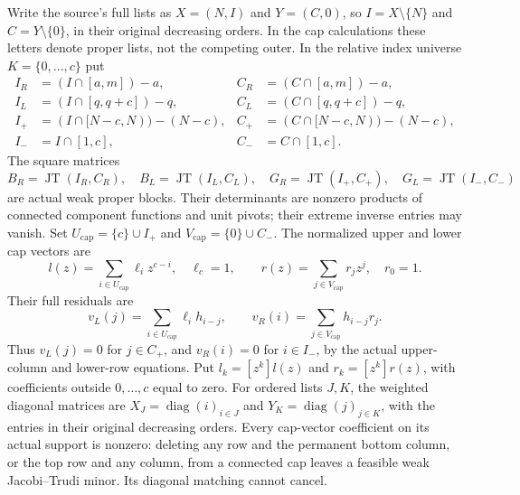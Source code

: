 \documentclass[11pt,a4paper]{amsart}
\numberwithin{equation}{section}
\theoremstyle{plain}
\theoremstyle{definition}
\newcommand{\JT}{\operatorname{JT}}
\DeclareMathOperator{\diag}{diag}
\begin{document}
Write the source's full lists as \(X=(N,I)\) and \(Y=(C,0)\), so
\(I=X\setminus\{N\}\) and \(C=Y\setminus\{0\}\), in their original
decreasing orders.  In the cap calculations these letters denote proper
lists, not the competing outer.
In the relative index universe \(K=\{0,\ldots,c\}\) put
\[
 \begin{aligned}
 I_R&=(I\cap[a,m])-a,&C_R&=(C\cap[a,m])-a,\\
 I_L&=(I\cap[q,q+c])-q,&C_L&=(C\cap[q,q+c])-q,\\
 I_+&=(I\cap[N-c,N))- (N-c),&C_+&=(C\cap[N-c,N))-(N-c),\\
 I_-&=I\cap[1,c],&C_-&=C\cap[1,c].
 \end{aligned}
\]
The square matrices
\[
 B_R=\JT(I_R,C_R),\quad B_L=\JT(I_L,C_L),\quad
 G_R=\JT(I_+,C_+),\quad G_L=\JT(I_-,C_-)
\]
are actual weak proper blocks.  Their determinants are nonzero products of
connected component functions and unit pivots; their extreme inverse
entries may vanish.  Set \(U_{\mathrm{cap}}=\{c\}\cup I_+\) and \(V_{\mathrm{cap}}=\{0\}\cup C_-\).
The normalized upper and lower cap vectors are
\begin{equation}\label{eq:cap-polynomials}
 l(z)=\sum_{i\in U_{\mathrm{cap}}}\ell_i z^{c-i},\quad\ell_c=1,
 \qquad r(z)=\sum_{j\in V_{\mathrm{cap}}}r_jz^j,\quad r_0=1.
\end{equation}
Their full residuals are
\[
 v_L(j)=\sum_{i\in U_{\mathrm{cap}}}\ell_i h_{i-j},\qquad
 v_R(i)=\sum_{j\in V_{\mathrm{cap}}}h_{i-j}r_j.
\]
Thus \(v_L(j)=0\) for \(j\in C_+\), and \(v_R(i)=0\) for \(i\in I_-\),
by the actual upper-column and lower-row equations.
Put \(l_k=[z^k]l(z)\) and \(r_k=[z^k]r(z)\), with coefficients outside
\(0,\ldots,c\) equal to zero.  For ordered lists \(J,K\), the weighted
diagonal matrices are \(X_J=\diag(i)_{i\in J}\) and \(Y_K=\diag(j)_{j\in K}\),
with the entries in their original decreasing orders.
Every cap-vector coefficient on its actual support is nonzero: deleting any row
and the permanent bottom column, or the top row and any column, from a
connected cap leaves a feasible weak Jacobi--Trudi minor.  Its diagonal
matching cannot cancel.
\end{document}

